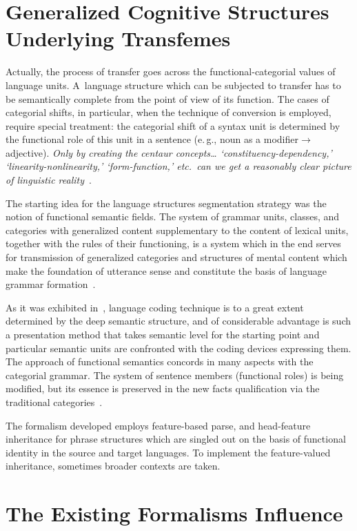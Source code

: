 \begin{multicols}{2}
\section{Generalized Cognitive Structures Underlying Transfemes}

\noindent
     Actually, the process of transfer goes across the functional-categorial 
values of language units. A~language structure which can be subjected to transfer 
has to be semantically complete from the point of view of its function. The cases of 
categorial shifts, in particular, when the technique of conversion is employed, 
require special treatment: the categorial shift of a syntax unit is determined by the 
functional role of this unit in a sentence (e.\,g., noun as a 
modifier\;$\rightarrow$\;adjective). \textit{Only by creating the centaur concepts\ldots
`constituency-dependency,' `linearity-nonlinearity,' `form-function,' etc.\ can we 
get a reasonably clear picture of linguistic reality}~\cite{6-koz}.
     
     The starting idea for the language structures segmentation strategy was the 
notion of functional semantic fields. The system of grammar units, classes, and 
categories with generalized content supplementary to the content of lexical units, 
together with the rules of their functioning, is a system which in the end serves for 
transmission of generalized categories and structures of mental content which make 
the foundation of utterance sense and constitute the basis of language grammar 
formation~\cite{7-koz}. 
     
     As it was exhibited in~\cite{8-koz}, language coding technique is to a great 
extent determined by the deep semantic structure, and of considerable advantage is 
such a presentation method that takes  semantic level for the starting point 
and particular semantic units are confronted with the coding devices expressing 
them. The approach of functional semantics concords in many aspects with the 
categorial grammar. The system of sentence members (functional roles) is being 
modified, but its essence is preserved in the new facts qualification via the 
traditional categories~\cite{9-koz}. 
     
     The formalism developed employs feature-based parse, and head-feature 
inheritance for phrase structures which are singled out on the basis of functional 
identity in the source and target languages. To implement the feature-valued 
inheritance, sometimes broader contexts are taken. 

\section{The Existing Formalisms Influence}


\end{multicols}
